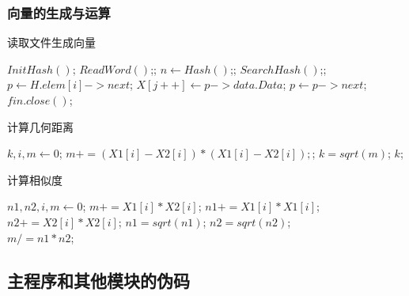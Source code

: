 \documentclass[a4paper]{article}
\begin{document}
	\subsubsection{向量的生成与运算}
	\begin{algorithm}[H]
		\caption{读取文件生成向量}
		\begin{algorithmic}[1] %
				\State $InitHash()$;
					\State $ReadWord()$;;
					\State $n \gets Hash()$;;
					\State $SearchHash()$;;
				\EndWhile
					\State $p \gets H.elem[i]->next$;
						\State $X[j++] \gets p->data.Data$;
						\State $p \gets p->next$;
					\EndWhile
				\EndFor
				\State $fin.close()$;
			\EndFunction
		\end{algorithmic}\label{alg:algorithm3}
	\end{algorithm}

	\begin{algorithm}[H]
		\caption{计算几何距离}
		\begin{algorithmic}[1] %
				\State $k,i,m \gets 0$;
				\For{$each\ i\ in\ [0,16)$}
					\State $m += (X1[i] - X2[i]) * (X1[i] - X2[i]);$;
				\EndFor
				\State $k = sqrt(m)$;
				\Return $k$;
			\EndFunction
		\end{algorithmic}\label{alg:algorithm4}
	\end{algorithm}

	\begin{algorithm}[H]
		\caption{计算相似度}
		\begin{algorithmic}[1] %
				\State $n1,n2,i,m \gets 0$;
				\For{$each\ i\ in\ [0,16)$}
					\State $m += X1[i] * X2[i]$;
					\State $n1 += X1[i] * X1[i]$;
					\State $n2 += X2[i] * X2[i]$;
				\EndFor
				\State $n1 = sqrt(n1)$;
				\State $n2 = sqrt(n2)$;\\
				\Return $m /= n1 * n2$;
			\EndFunction
		\end{algorithmic}\label{alg:algorithm5}
	\end{algorithm}

	\subsection{主程序和其他模块的伪码}\label{subsec:code2}
\end{document}
